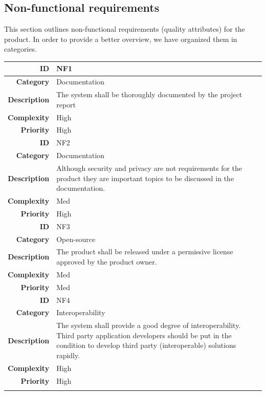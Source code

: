 
\subsection{Non-functional requirements}
\label{section:nonfunctionalreq}

This section outlines non-functional requirements (quality attributes) for the product.
In order to provide a better overview, we have organized them in categories.

\begin{table}[h]
\begin{center}
\begin{tabular}{ | r | p{11.5cm} | }
  \hline
  
  \textbf{ID} & NF1 \\
  \hline\noalign{\smallskip}\hline
  \textbf{Category}			&	Documentation\\
  \textbf{Description}	& The system shall be thoroughly documented by the project report \\
  \textbf{Complexity}		& High \\
  \textbf{Priority}			& High \\
  \hline\noalign{\smallskip}\noalign{\smallskip}\hline

  \textbf{ID} & NF2 \\
  \hline\noalign{\smallskip}\hline
  \textbf{Category}			&	Documentation\\
  \textbf{Description}	& Although security and privacy are not requirements for the product they
													are important topics to be discussed in the documentation. \\
  \textbf{Complexity}		& Med \\
  \textbf{Priority}			& High \\
  \hline\noalign{\smallskip}\noalign{\smallskip}\hline

  \textbf{ID} & NF3 \\
  \hline\noalign{\smallskip}\hline
  \textbf{Category}			&	Open-source\\
  \textbf{Description}	& The product shall be released under a permissive license approved by the product owner. \\
  \textbf{Complexity}		& Med \\
  \textbf{Priority}			& Med \\
  \hline\noalign{\smallskip}\noalign{\smallskip}\hline
  
  \textbf{ID} & NF4 \\
  \hline\noalign{\smallskip}\hline
  \textbf{Category}			&	Interoperability \\
  \textbf{Description}	& The system shall provide a good degree of interoperability.
  												Third party application developers should be put in the condition to develop
  												third party (interoperable) solutions rapidly. \\
  \textbf{Complexity}		& High \\
  \textbf{Priority}			& High \\
  \hline\noalign{\smallskip}\noalign{\smallskip}\hline


\end{tabular}
\end{center}
\end{table}
